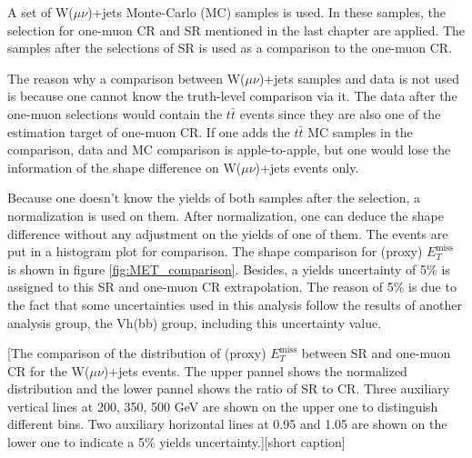 \documentclass[class=NCU_thesis, crop=false]{standalone}
\begin{document}
		A set of W($\mu \nu$)+jets Monte-Carlo (MC) samples is used. In these samples, the selection for one-muon CR and SR mentioned in the last chapter are applied. The samples after the selections of SR is used as a comparison to the one-muon CR.
		
		The reason why a comparison between W($\mu \nu$)+jets samples and data is not used is because one cannot know the truth-level comparison via it. The data after the one-muon selections would contain the $t\bar{t}$ events since they are also one of the estimation target of one-muon CR. If one adds the $t\bar{t}$ MC samples in the comparison, data and MC comparison is apple-to-apple, but one would lose the information of the shape difference on W($\mu \nu$)+jets events only. 

		Because one doesn't know the yields of both samples after the selection, a normalization is used on them. After normalization, one can deduce the shape difference without any adjustment on the yields of one of them. The events are put in a histogram plot for comparison. The shape comparison for (proxy) $E_T^{\mathrm{miss}}$ is shown in figure \ref{fig:MET_comparison}. Besides, a yields uncertainty of 5\% is assigned to this SR and one-muon CR extrapolation. The reason of 5\% is due to the fact that some uncertainties used in this analysis follow the results of another analysis group, the Vh(bb) group, including this uncertainty value.
		
		[The comparison of the distribution of (proxy) $E_T^{\mathrm{miss}}$ between SR and one-muon CR for the W($\mu \nu$)+jets events. The upper pannel shows the normalized distribution and the lower pannel shows the ratio of SR to CR. Three auxiliary vertical lines at 200, 350, 500 GeV are shown on the upper one to distinguish different bins. Two auxiliary horizontal lines at 0.95 and 1.05 are shown on the lower one to indicate a 5\% yields uncertainty.][short caption]

	
\end{document}
